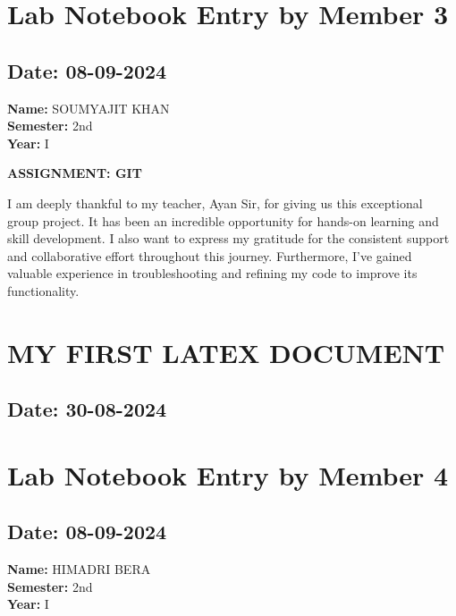 \documentclass[12pt]{article}
\begin{document}
\section{Lab Notebook Entry by Member 3}
\subsection*{Date: 08-09-2024}

\begin{flushright}
\textbf{Name:} SOUMYAJIT KHAN \\
\textbf{Semester:} 2nd \\
\textbf{Year:} I \\
\end{flushright}

\begin{center}
\Huge \textbf{ASSIGNMENT: GIT}
\end{center}

I am deeply thankful to my teacher, Ayan Sir, for giving us this exceptional group project. It has been an incredible opportunity for hands-on learning and skill development. I also want to express my gratitude for the consistent support and collaborative effort throughout this journey. Furthermore, I've gained valuable experience in troubleshooting and refining my code to improve its functionality.

\newpage
\section{MY FIRST LATEX DOCUMENT}
\subsection*{Date: 30-08-2024}
\newpage
\section{Lab Notebook Entry by Member 4}
\subsection*{Date: 08-09-2024}

\begin{flushright}
\textbf{Name:} HIMADRI BERA \\
\textbf{Semester:} 2nd \\
\textbf{Year:} I \\
\end{flushright}
\end{document}
